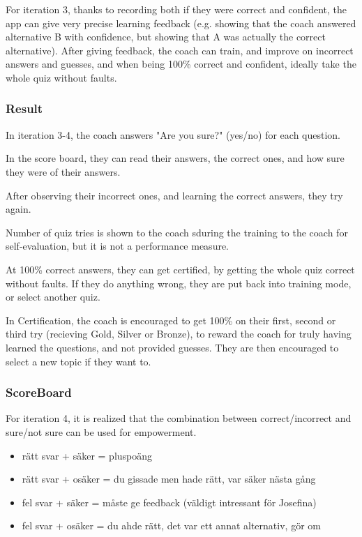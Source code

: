 
  For iteration 3, thanks to recording both if they were correct and confident, the app can give very precise learning feedback (e.g. showing that the coach answered alternative B with confidence, but showing that A was actually the correct alternative). After giving feedback, the coach can train, and improve on incorrect answers and guesses, and when being 100\% correct and confident, ideally take the whole quiz without faults.

  \subsubsection{Result}

  In iteration 3-4, the coach answers "Are you sure?" (yes/no) for each question.

  In the score board, they can read their answers, the correct ones, and how sure they were of their answers.

  After observing their incorrect ones, and learning the correct answers, they try again.

  Number of quiz tries is shown to the coach sduring the training to the coach for self-evaluation, but it is not a performance measure.


  At 100\% correct answers, they can get certified, by getting the whole quiz correct without faults. If they do anything wrong, they are put back into training mode, or select another quiz.

  In Certification, the coach is encouraged to get 100\% on their first, second or third try (recieving Gold, Silver or Bronze), to reward the coach for truly having learned the questions, and not provided guesses. They are then encouraged to select a new topic if they want to.

  \subsubsection{ScoreBoard} 
  For iteration 4, it is realized that the combination between correct/incorrect and sure/not sure can be used for empowerment.

  \begin{itemize}
  \item rätt svar + säker = pluspoäng
  \item rätt svar + osäker = du gissade men hade rätt, var säker nästa gång
  \item fel svar + säker = måste ge feedback (väldigt intressant för Josefina)
  \item fel svar + osäker = du ahde rätt, det var ett annat alternativ, gör om
  \end{itemize}

